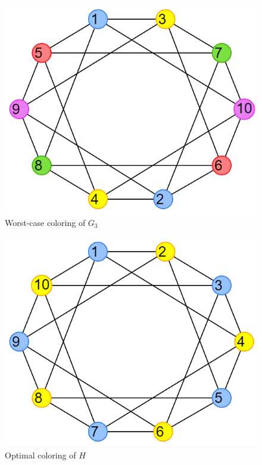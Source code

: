 \documentclass{article}
\theoremstyle{definition}
\begin{document}
\begin{multicols}{2}
  \begin{figure}[H]
  \centering
  \includegraphics[scale=0.38]{images/graph-5.png}
  \caption{Worst-case coloring of \(G_3\)}\label{fig:ex3-colored}
  \end{figure}

  \begin{figure}[H]
  \centering
  \includegraphics[scale=0.38]{images/graph-6.png}
  \caption{Optimal coloring of \(H\)}\label{fig:ex3-optimal}
  \end{figure}
\end{multicols}
\end{document}
